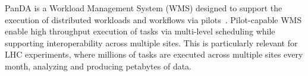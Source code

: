 PanDA is a Workload Management System (WMS) %
designed to support the execution of distributed workloads and workflows via
pilots~\cite{turilli2015comprehensive}. Pilot-capable WMS enable high
throughput execution of tasks via multi-level scheduling while supporting
interoperability across multiple sites. This is particularly relevant for LHC
experiments, where millions of tasks are executed across multiple sites every
month, analyzing and producing petabytes of data. 






